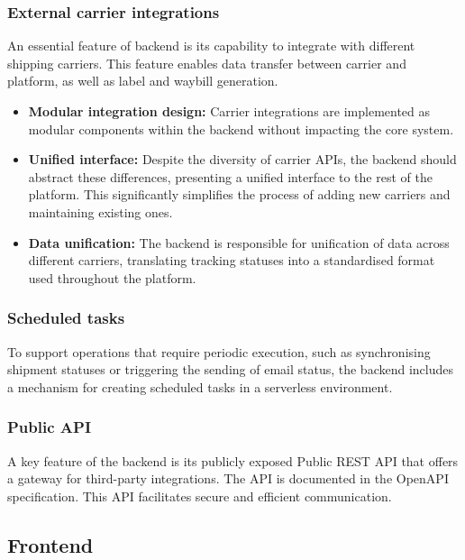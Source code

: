 \subsubsection{External carrier integrations}
An essential feature of backend is its capability to integrate with different shipping carriers.
This feature enables data transfer between carrier and platform, as well as label and waybill generation.
\begin{itemize}
    \item \textbf{Modular integration design:} Carrier integrations are implemented as modular components within the backend without impacting the core system.
    \item \textbf{Unified interface:} Despite the diversity of carrier APIs, the backend should abstract these differences, presenting a unified interface to the rest of the platform. This significantly simplifies the process of adding new carriers and maintaining existing ones.
    \item \textbf{Data unification:} The backend is responsible for unification of data across different carriers, translating tracking statuses into a standardised format used throughout the platform.
\end{itemize}

\subsubsection{Scheduled tasks}
To support operations that require periodic execution, such as synchronising shipment statuses or triggering the sending of email status, the backend includes a mechanism for creating scheduled tasks in a serverless environment.

\subsubsection{Public API}
A key feature of the backend is its publicly exposed Public REST API that offers a gateway for third-party integrations.
The API is documented in the OpenAPI specification.
This API facilitates secure and efficient communication. 

\subsection{Frontend}
\label{subsec:frontend}
